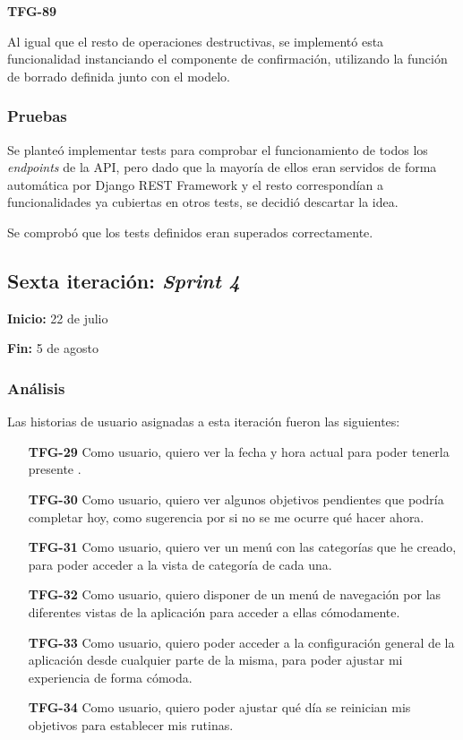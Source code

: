 \documentclass[10pt, a4paper]{aqademic}
\begin{document}
\medskip

\textbf{TFG-89}

Al igual que el resto de operaciones destructivas, se implementó esta funcionalidad instanciando el componente de confirmación, utilizando la función de borrado definida junto con el modelo.


\subsubsection{Pruebas}

Se planteó implementar tests para comprobar el funcionamiento de todos los \textit{endpoints} de la API, pero dado que la mayoría de ellos eran servidos de forma automática por Django REST Framework y el resto correspondían a funcionalidades ya cubiertas en otros tests, se decidió descartar la idea.

Se comprobó que los tests definidos eran superados correctamente.


\subsection{Sexta iteración: \textit{Sprint 4}}

\textbf{Inicio:} 22 de julio

\textbf{Fin:} 5 de agosto


\subsubsection{Análisis}

Las historias de usuario asignadas a esta iteración fueron las siguientes:

\begin{itemize}[leftmargin=16mm]
	\item [\textbf{TFG-29}] Como usuario, quiero ver la fecha y hora actual para poder tenerla presente .
	
	\item [\textbf{TFG-30}] Como usuario, quiero ver algunos objetivos pendientes que podría completar hoy, como sugerencia por si no se me ocurre qué hacer ahora.
	
	\item [\textbf{TFG-31}] Como usuario, quiero ver un menú con las categorías que he creado, para poder acceder a la vista de categoría de cada una.
	
	\item [\textbf{TFG-32}] Como usuario, quiero disponer de un menú de navegación por las diferentes vistas de la aplicación para acceder a ellas cómodamente.
	
	\item [\textbf{TFG-33}] Como usuario, quiero poder acceder a la configuración general de la aplicación desde cualquier parte de la misma, para poder ajustar mi experiencia de forma cómoda.
	
	\item [\textbf{TFG-34}] Como usuario, quiero poder ajustar qué día se reinician mis objetivos para establecer mis rutinas.
\end{itemize}
\end{document}
